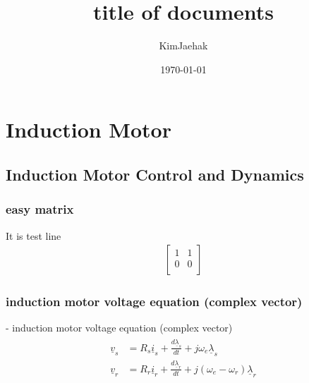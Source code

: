 \documentclass[12pt, a4paper]{report}
\title{title of documents}
\author{KimJaehak}
\date{\today}
\begin{document}
\maketitle %
\tableofcontents %

\chapter{Induction Motor}

\section{Induction Motor Control and Dynamics}

\subsection{easy matrix}

It is test line
\begin{align}
	\label{eq:test}
	\begin{bmatrix}
		1 & 1 \\
		0 & 0 \\
	\end{bmatrix}
\end{align}

\subsection{induction motor voltage equation (complex vector)}
- induction motor voltage equation (complex vector)
\begin{align}
	\begin{aligned}
		\underline{v}_s &= R_s \underline{i}_s + \frac{d\underline{\lambda}_s}{dt} + j \omega_e \underline{\lambda}_s \\
		\underline{v}_r &= R_r \underline{i}_r + \frac{d\underline{\lambda}_r}{dt} + j (\omega_e - \omega_r) \underline{\lambda}_r
	\end{aligned}
\end{align}
\end{document}
